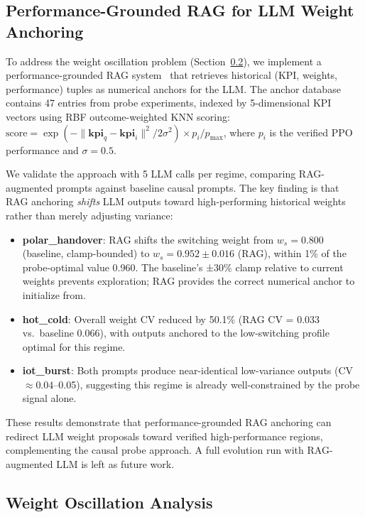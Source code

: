 \documentclass[conference]{IEEEtran}
\begin{document}
\subsection{Performance-Grounded RAG for LLM Weight Anchoring}
\label{sec:rag}

To address the weight oscillation problem (Section~\ref{sec:oscillation}), we implement a performance-grounded RAG system~\cite{lewis2020rag, grounding2025rl} that retrieves historical (KPI, weights, performance) tuples as numerical anchors for the LLM. The anchor database contains 47 entries from probe experiments, indexed by 5-dimensional KPI vectors using RBF outcome-weighted KNN scoring: $\text{score} = \exp(-\|\mathbf{kpi}_q - \mathbf{kpi}_i\|^2 / 2\sigma^2) \times p_i / p_{\max}$, where $p_i$ is the verified PPO performance and $\sigma = 0.5$.

We validate the approach with 5 LLM calls per regime, comparing RAG-augmented prompts against baseline causal prompts. The key finding is that RAG anchoring \emph{shifts} LLM outputs toward high-performing historical weights rather than merely adjusting variance:

\begin{itemize}
\item \textbf{polar\_handover}: RAG shifts the switching weight from $w_s = 0.800$ (baseline, clamp-bounded) to $w_s = 0.952 \pm 0.016$ (RAG), within 1\% of the probe-optimal value 0.960. The baseline's ±30\% clamp relative to current weights prevents exploration; RAG provides the correct numerical anchor to initialize from.
\item \textbf{hot\_cold}: Overall weight CV reduced by 50.1\% (RAG CV = 0.033 vs.\ baseline 0.066), with outputs anchored to the low-switching profile optimal for this regime.
\item \textbf{iot\_burst}: Both prompts produce near-identical low-variance outputs (CV $\approx 0.04$--0.05), suggesting this regime is already well-constrained by the probe signal alone.
\end{itemize}

These results demonstrate that performance-grounded RAG anchoring can redirect LLM weight proposals toward verified high-performance regions, complementing the causal probe approach. A full evolution run with RAG-augmented LLM is left as future work.

\subsection{Weight Oscillation Analysis}
\label{sec:oscillation}
\end{document}
